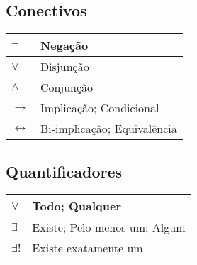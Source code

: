 \subsection{Conectivos}
    \begin{center}
        \begin{longtable}{| m{3cm} | m{12cm} |}
                \hline $ \neg $ & Negação\\
                \hline $ \vee $ & Disjunção\\
                \hline $ \wedge $ & Conjunção\\
                \hline $ \rightarrow $ & Implicação; Condicional\\
                \hline $ \leftrightarrow $ & Bi-implicação; Equivalência\\
                \hline
            \end{longtable}
    \end{center}
\subsection{Quantificadores}
    \begin{center}
        \begin{longtable}{| m{3cm} | m{12cm} |}
            \hline $ \forall $ & Todo; Qualquer\\
            \hline $ \exists $ & Existe; Pelo menos um; Algum\\
            \hline $ \exists ! $ & Existe exatamente um\\
            \hline
        \end{longtable}
    \end{center}
